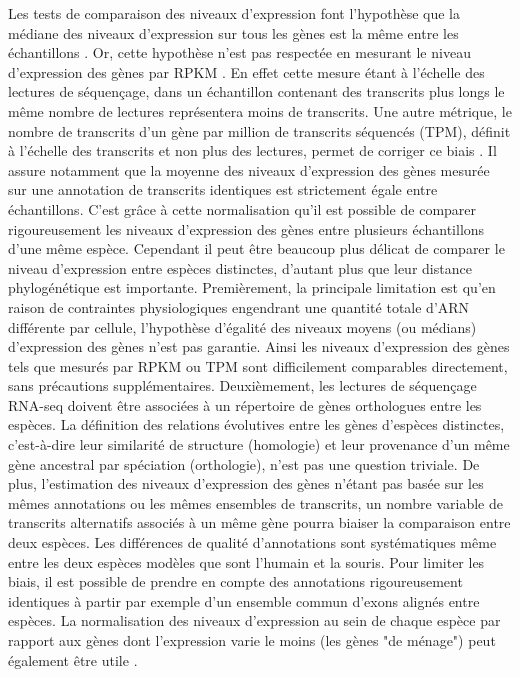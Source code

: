 Les tests de comparaison des niveaux d’expression font l’hypothèse que la médiane des niveaux d’expression sur tous les gènes est la même entre les échantillons \citep{robinson_edger_2010, love_moderated_2014}. Or, cette hypothèse n’est pas respectée en mesurant le niveau d’expression des gènes par \acrshort{RPKM} \citep{wagner_measurement_2012}. En effet cette mesure étant à l’échelle des lectures de séquençage, dans un échantillon contenant des transcrits plus longs le même nombre de lectures représentera moins de transcrits. Une autre métrique, le nombre de transcrits d’un gène par million de transcrits séquencés (TPM), définit à l’échelle des transcrits et non plus des lectures, permet de corriger ce biais \citep{wagner_measurement_2012}. Il assure notamment que la moyenne des niveaux d’expression des gènes mesurée sur une annotation de transcrits identiques est strictement égale entre échantillons. C’est grâce à cette normalisation qu’il est possible de comparer rigoureusement les niveaux d’expression des gènes entre plusieurs échantillons d’une même espèce. Cependant il peut être beaucoup plus délicat de comparer le niveau d’expression entre espèces distinctes, d’autant plus que leur distance phylogénétique est importante. Premièrement, la principale limitation est qu’en raison de contraintes physiologiques engendrant une quantité totale d’\acrshort{ARN} différente par cellule, l’hypothèse d’égalité des niveaux moyens (ou médians) d’expression des gènes n’est pas garantie. Ainsi les niveaux d’expression des gènes tels que mesurés par \acrshort{RPKM} ou TPM sont difficilement comparables directement, sans précautions supplémentaires. Deuxièmement, les lectures de séquençage \acrshort{RNA-seq} doivent être associées à un répertoire de gènes orthologues entre les espèces. La définition des relations évolutives entre les gènes d’espèces distinctes, c'est-à-dire leur similarité de structure (homologie) et leur provenance d’un même gène ancestral par spéciation (orthologie), n’est pas une question triviale. De plus, l'estimation des niveaux d'expression des gènes n’étant pas basée sur les mêmes annotations ou les mêmes ensembles de transcrits, un nombre variable de transcrits alternatifs associés à un même gène pourra biaiser la comparaison entre deux espèces. Les différences de qualité d'annotations sont systématiques même entre les deux espèces modèles que sont l’humain et la souris. Pour limiter les biais, il est possible de prendre en compte des annotations rigoureusement identiques à partir par exemple d’un ensemble commun d’exons alignés entre espèces. La normalisation des niveaux d’expression au sein de chaque espèce par rapport aux gènes dont l’expression varie le moins (les gènes "de ménage") peut également être utile \citep{brawand_evolution_2011}.


